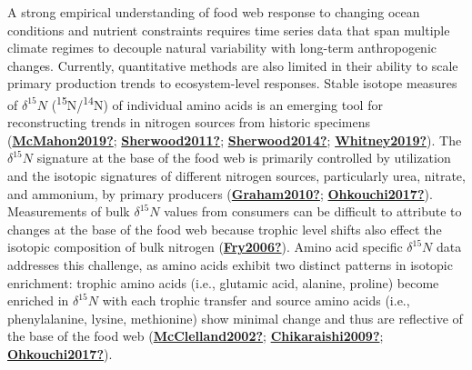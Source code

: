 \documentclass [11pt, proquest] {uwthesis}[2015/03/03]
\begin{document}
A strong empirical understanding of food web response to changing ocean conditions and nutrient constraints requires time series data that span multiple climate regimes to decouple natural variability with long-term anthropogenic changes. Currently, quantitative methods are also limited in their ability to scale primary production trends to ecosystem-level responses. Stable isotope measures of \(\delta^{15}N\) (\textsuperscript{15}N/\textsuperscript{14}N) of individual amino acids is an emerging tool for reconstructing trends in nitrogen sources from historic specimens (\protect\hyperlink{ref-McMahon2019}{\textbf{McMahon2019?}}; \protect\hyperlink{ref-Sherwood2011}{\textbf{Sherwood2011?}}; \protect\hyperlink{ref-Sherwood2014}{\textbf{Sherwood2014?}}; \protect\hyperlink{ref-Whitney2019}{\textbf{Whitney2019?}}). The \(\delta^{15}N\) signature at the base of the food web is primarily controlled by utilization and the isotopic signatures of different nitrogen sources, particularly urea, nitrate, and ammonium, by primary producers (\protect\hyperlink{ref-Graham2010}{\textbf{Graham2010?}}; \protect\hyperlink{ref-Ohkouchi2017}{\textbf{Ohkouchi2017?}}). Measurements of bulk \(\delta^{15}N\) values from consumers can be difficult to attribute to changes at the base of the food web because trophic level shifts also effect the isotopic composition of bulk nitrogen (\protect\hyperlink{ref-Fry2006}{\textbf{Fry2006?}}). Amino acid specific \(\delta^{15}N\) data addresses this challenge, as amino acids exhibit two distinct patterns in isotopic enrichment: trophic amino acids (i.e., glutamic acid, alanine, proline) become enriched in \(\delta^{15}N\) with each trophic transfer and source amino acids (i.e., phenylalanine, lysine, methionine) show minimal change and thus are reflective of the base of the food web (\protect\hyperlink{ref-McClelland2002}{\textbf{McClelland2002?}}; \protect\hyperlink{ref-Chikaraishi2009}{\textbf{Chikaraishi2009?}}; \protect\hyperlink{ref-Ohkouchi2017}{\textbf{Ohkouchi2017?}}).
\end{document}
